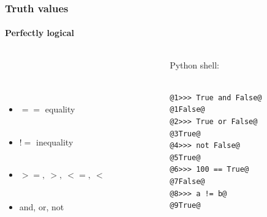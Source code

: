 \documentclass{beamer}
\begin{document}
\begin{frame}[fragile]
\frametitle{Truth values}
\framesubtitle{Perfectly logical}
\large
  \begin{columns}[T]
    \begin{column}{.5\textwidth} 
\ \\ 

\ \\ 


\ \\ 


\begin{itemize}


\item $==$  equality \\ \
\item $!=$ inequality \\ \
 \item$ >=,~ >,~ <=,~ <$\\ \
 \item and, or, not \\ \



\end{itemize}
     \end{column}
     
         \begin{column}{.5\textwidth} 
         Python shell: \\ \
\begin{lstlisting}[style=base]
@1>>> True and False@
@1False@
@2>>> True or False@
@3True@
@4>>> not False@
@5True@
@6>>> 100 == True@
@7False@
@8>>> a != b@
@9True@
\end{lstlisting}

    \end{column}
    \end{columns}

\end{frame}
%
\end{document}
